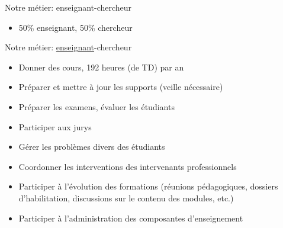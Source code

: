 \documentclass[10pt,final,usepdftitle=false]{beamer}
\author{M. Quinson\\[0.5em]
  \small  (merci à \textbf{L. Nussbaum} pour la plupart de ces transparents)\\[0.5em]
  \url{https://github.com/lnussbaum/slides-sem}} \date{} \usepackage{eurosym}
\begin{document}
\frame{\titlepage}

\begin{frame}{Notre métier: enseignant-chercheur}
\begin{itemize}
\item 50\% enseignant, 50\% chercheur
\end{itemize}
\end{frame}

\begin{frame}{Notre métier: \underline{enseignant}-chercheur}
\begin{itemize}
\item Donner des cours, 192 heures (de TD) par an
\item Préparer et mettre à jour les supports (veille nécessaire)
\item Préparer les examens, évaluer les étudiants
\item Participer aux jurys
\item Gérer les problèmes divers des étudiants
\item Coordonner les interventions des intervenants professionnels
\item Participer à l'évolution des formations (réunions pédagogiques, dossiers
  d'habilitation, discussions sur le contenu des modules, etc.)
\item Participer à l'administration des composantes d'enseignement
\end{itemize}
\end{frame}
\end{document}
